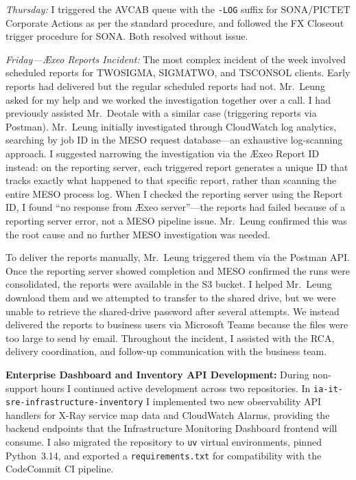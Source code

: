 \textit{Thursday:} I triggered the AVCAB queue with the \texttt{-LOG} suffix for SONA/PICTET Corporate Actions as per the standard procedure, and followed the FX Closeout trigger procedure for SONA. Both resolved without issue.

\textit{Friday---\AE xeo Reports Incident:} The most complex incident of the week involved scheduled reports for TWOSIGMA, SIGMATWO, and TSCONSOL clients. Early reports had delivered but the regular scheduled reports had not. Mr.\ Leung asked for my help and we worked the investigation together over a call. I had previously assisted Mr.\ Deotale with a similar case (triggering reports via Postman). Mr.\ Leung initially investigated through CloudWatch log analytics, searching by job ID in the MESO request database---an exhaustive log-scanning approach. I suggested narrowing the investigation via the \AE xeo Report ID instead: on the reporting server, each triggered report generates a unique ID that tracks exactly what happened to that specific report, rather than scanning the entire MESO process log. When I checked the reporting server using the Report ID, I found ``no response from \AE xeo server''---the reports had failed because of a reporting server error, not a MESO pipeline issue. Mr.\ Leung confirmed this was the root cause and no further MESO investigation was needed.

To deliver the reports manually, Mr.\ Leung triggered them via the Postman API. Once the reporting server showed completion and MESO confirmed the runs were consolidated, the reports were available in the S3 bucket. I helped Mr.\ Leung download them and we attempted to transfer to the shared drive, but we were unable to retrieve the shared-drive password after several attempts. We instead delivered the reports to business users via Microsoft Teams because the files were too large to send by email. Throughout the incident, I assisted with the RCA, delivery coordination, and follow-up communication with the business team.


\textbf{Enterprise Dashboard and Inventory API Development:} 
During non-support hours I continued active development across two repositories. In \texttt{ia-it-sre-infrastructure-inventory} I implemented two new observability API handlers for X-Ray service map data and CloudWatch Alarms, providing the backend endpoints that the Infrastructure Monitoring Dashboard frontend will consume. I also migrated the repository to \texttt{uv} virtual environments, pinned Python~3.14, and exported a \texttt{requirements.txt} for compatibility with the CodeCommit CI pipeline.

